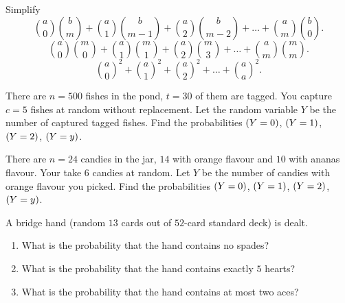 \documentclass[12pt]{article}
\let\P\relax
\DeclareMathOperator{\P}{\mathbb{P}}
\begin{document}
\begin{exercise}
Simplify 
\[
{a \choose 0}{b \choose m} + {a \choose 1}{b \choose m-1} + {a \choose 2}{b \choose m-2} + \dots + {a \choose m}{b \choose 0}.
\]
\[
{a \choose 0}{m \choose 0} + {a \choose 1}{m \choose 1} + {a \choose 2}{m \choose 3} + \dots + {a \choose m}{m \choose m}.
\]
\[
{a \choose 0}^2 + {a \choose 1}^2  + {a \choose 2}^2 + \dots + {a \choose a}^2.
\]
\end{exercise}

\begin{exercise}
There are $n = 500$ fishes in the pond, $t = 30$ of them are tagged. You capture $c = 5$ fishes at random without replacement. 
Let the random variable $Y$ be the number of captured tagged fishes. 
Find the probabilities $\P(Y = 0)$, $\P(Y = 1)$, $\P(Y = 2)$, $\P(Y = y)$.
\end{exercise}

\begin{exercise}
There are $n = 24$ candies in the jar, $14$ with orange flavour and $10$ with ananas flavour.
Your take $6$ candies at random. Let $Y$ be the number of candies with orange flavour you picked. 
Find the probabilities $\P(Y = 0)$, $\P(Y = 1)$, $\P(Y = 2)$, $\P(Y = y)$.
\end{exercise}

\begin{exercise}
A bridge hand (random $13$ cards out of $52$-card standard deck) is dealt. 

\begin{enumerate}[label=\alph*)]
\item What is the probability that the hand contains no spades? 
\item What is the probability that the hand contains exactly $5$ hearts? 
\item What is the probability that the hand contains at most two aces? 
\end{enumerate}
\end{exercise}
\end{document}
